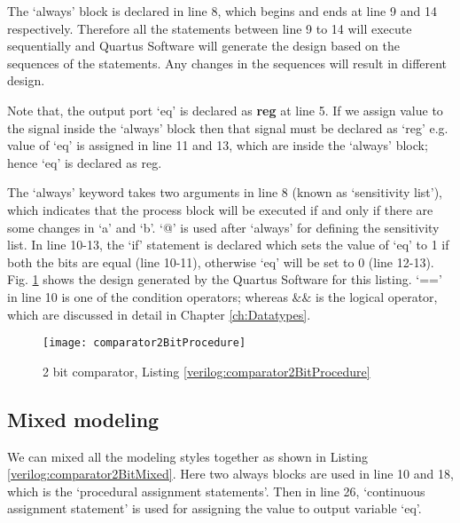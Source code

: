 \begin{explanation}
	The `always' block is declared in line 8, which begins and ends at line 9 and 14 respectively. Therefore all the statements between line 9 to 14 will execute sequentially and Quartus Software will generate the design based on the sequences of the statements.  Any changes in the sequences will result in different design.
	
	Note that, the output port `eq' is declared as \textbf{reg} at line 5. If we assign value to the signal inside the `always' block then that signal must be declared as `reg' e.g. value of `eq' is assigned in line 11 and 13, which are inside the `always' block; hence `eq' is declared as reg. 
	
	The `always' keyword takes two arguments in line 8 (known as `sensitivity list'), which indicates that the process block will be executed if and only if there are some changes in `a' and `b'. `@' is used after `always' for defining the sensitivity list. In line 10-13, the `if' statement is declared which sets the value of `eq' to 1 if both the bits are equal (line 10-11), otherwise `eq' will be set to 0 (line 12-13). Fig. \ref{fig:comparator2BitProcedure} shows the design generated by the Quartus Software for this listing. `==' in line 10 is one of the condition operators; whereas $\&\&$ is the logical operator, which are discussed in detail in Chapter \ref{ch:Datatypes}.
\end{explanation}

\begin{figure}
	\centering
	\texttt{[image: comparator2BitProcedure]}
	\caption{2 bit comparator, Listing \ref{verilog:comparator2BitProcedure}}
	\label{fig:comparator2BitProcedure}
\end{figure}

\subsection{Mixed modeling}
We can mixed all the modeling styles together as shown in Listing \ref{verilog:comparator2BitMixed}. Here two always blocks are used in line 10 and 18, which is the `procedural assignment statements'. Then in line 26, `continuous assignment statement' is used for assigning the value to output variable `eq'.

